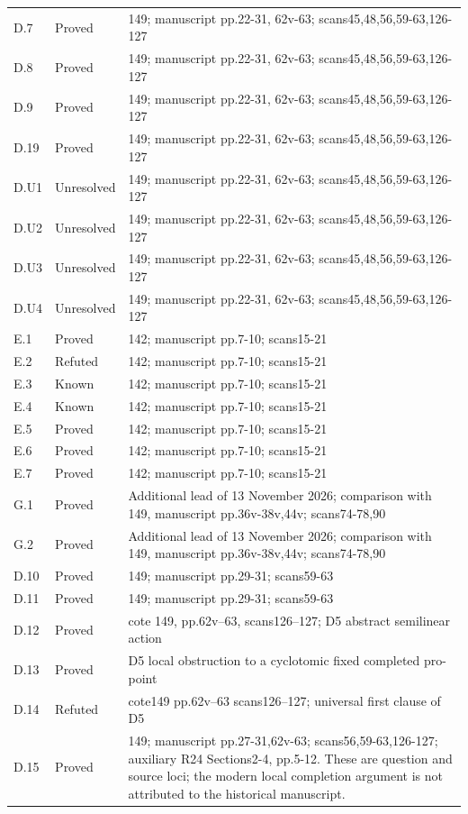 {\begin{longtable}{p{1.9cm}p{1.7cm}p{10.3cm}}
D.7 & Proved & 149; manuscript pp.22-31, 62v-63; scans45,48,56,59-63,126-127 \\
D.8 & Proved & 149; manuscript pp.22-31, 62v-63; scans45,48,56,59-63,126-127 \\
D.9 & Proved & 149; manuscript pp.22-31, 62v-63; scans45,48,56,59-63,126-127 \\
D.19 & Proved & 149; manuscript pp.22-31, 62v-63; scans45,48,56,59-63,126-127 \\
D.U1 & Unresolved & 149; manuscript pp.22-31, 62v-63; scans45,48,56,59-63,126-127 \\
D.U2 & Unresolved & 149; manuscript pp.22-31, 62v-63; scans45,48,56,59-63,126-127 \\
D.U3 & Unresolved & 149; manuscript pp.22-31, 62v-63; scans45,48,56,59-63,126-127 \\
D.U4 & Unresolved & 149; manuscript pp.22-31, 62v-63; scans45,48,56,59-63,126-127 \\
E.1 & Proved & 142; manuscript pp.7-10; scans15-21 \\
E.2 & Refuted & 142; manuscript pp.7-10; scans15-21 \\
E.3 & Known & 142; manuscript pp.7-10; scans15-21 \\
E.4 & Known & 142; manuscript pp.7-10; scans15-21 \\
E.5 & Proved & 142; manuscript pp.7-10; scans15-21 \\
E.6 & Proved & 142; manuscript pp.7-10; scans15-21 \\
E.7 & Proved & 142; manuscript pp.7-10; scans15-21 \\
G.1 & Proved & Additional lead of 13 November 2026; comparison with 149, manuscript pp.36v-38v,44v; scans74-78,90 \\
G.2 & Proved & Additional lead of 13 November 2026; comparison with 149, manuscript pp.36v-38v,44v; scans74-78,90 \\
D.10 & Proved & 149; manuscript pp.29-31; scans59-63 \\
D.11 & Proved & 149; manuscript pp.29-31; scans59-63 \\
D.12 & Proved & cote 149, pp.62v--63, scans126--127; D5 abstract semilinear action \\
D.13 & Proved & D5 local obstruction to a cyclotomic fixed completed pro-point \\
D.14 & Refuted & cote149 pp.62v--63 scans126--127; universal first clause of D5 \\
D.15 & Proved & 149; manuscript pp.27-31,62v-63; scans56,59-63,126-127; auxiliary R24 Sections2-4, pp.5-12. These are question and source loci; the modern local completion argument is not attributed to the historical manuscript. \\

\end{longtable}}
